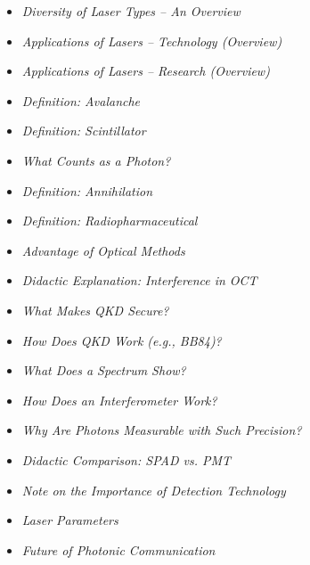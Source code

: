 \vspace{1em}
\begin{tcolorbox}[title=Didactic Boxes, didaktikbox]
	\begin{itemize}
		\item \emph{Diversity of Laser Types – An Overview} \dotfill\pageref{box:Typenvielfalt von Lasern}
		\item \emph{Applications of Lasers – Technology (Overview)} \dotfill\pageref{box:lasertechnik}
		\item \emph{Applications of Lasers – Research (Overview)} \dotfill\pageref{box:laser-app-forschung}
		\item \emph{Definition: Avalanche} \dotfill\pageref{box:avalanche}
		\item \emph{Definition: Scintillator} \dotfill\pageref{box:szintillator}
		\item \emph{What Counts as a Photon?} \dotfill\pageref{box:photonenzaehlung}
		\item \emph{Definition: Annihilation} \dotfill\pageref{box:annihilation}
		\item \emph{Definition: Radiopharmaceutical} \dotfill\pageref{box:radiopharmakon}
		\item \emph{Advantage of Optical Methods} \dotfill\pageref{box:optisches Verfahren}
		\item \emph{Didactic Explanation: Interference in OCT} \dotfill\pageref{box:interferenz_oct}
		\item \emph{What Makes QKD Secure?} \dotfill\pageref{box:qkd}
		\item \emph{How Does QKD Work (e.g., BB84)?} \dotfill\pageref{box:wie funktioniert QKD}
		\item \emph{What Does a Spectrum Show?} \dotfill\pageref{box:was zeigt spektrum}
		\item \emph{How Does an Interferometer Work?} \dotfill\pageref{box:interferometer}
		\item \emph{Why Are Photons Measurable with Such Precision?} \dotfill\pageref{box:photonen_genau}
	\end{itemize}
\end{tcolorbox}

\vspace{1em}
\begin{tcolorbox}[title=Reference Boxes, hinweisbox]
	\begin{itemize}
		\item \emph{Didactic Comparison: SPAD vs. PMT} \dotfill\pageref{box:vergleich SPAD}
		\item \emph{Note on the Importance of Detection Technology} \dotfill\pageref{box:detektionstechnologie}
		\item \emph{Laser Parameters} \dotfill\pageref{box:laserparameter}
		\item \emph{Future of Photonic Communication} \dotfill\pageref{box:Zukunft Kommunikation}
	\end{itemize}
\end{tcolorbox}
